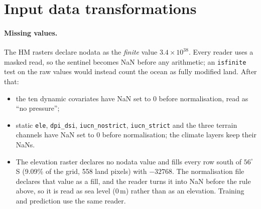 \documentclass[11pt,a4paper]{article}
\newcommand{\code}[1]{\texttt{\small #1}}
\begin{document}
\section{Input data transformations}
\label{sec:transform}

\paragraph{Missing values.} The HM rasters declare nodata as the \emph{finite} value
$3.4\times10^{38}$. Every reader uses a masked read, so the sentinel becomes NaN before any
arithmetic; an \code{isfinite} test on the raw values would instead count the ocean as fully
modified land. After that:
\begin{itemize}
\item the ten dynamic covariates have NaN set to 0 before normalisation, read as ``no pressure'';
\item static \code{ele}, \code{dpi\_dsi}, \code{iucn\_nostrict}, \code{iucn\_strict} and the three
  terrain channels have NaN set to 0 before normalisation; the climate layers keep their NaNs.
\item The elevation raster declares no nodata value and fills every row south of $56^\circ$S
  (9.09\% of the grid, 558 land pixels) with $-32768$. The normalisation file declares that value
  as a fill, and the reader turns it into NaN before the rule above, so it is read as sea level
  (0\,m) rather than as an elevation. Training and prediction use the same reader.
\end{itemize}
\end{document}
